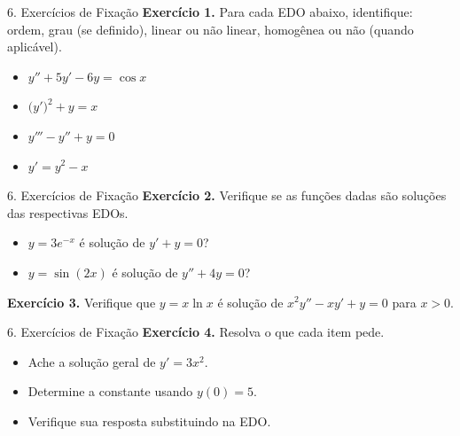 \documentclass[11pt, aspectratio=169, xcolor=table]{beamer}
\begin{document}

\begin{frame}{6. Exercícios de Fixação}
\textbf{Exercício 1.} Para cada EDO abaixo, identifique: ordem, grau (se definido), linear ou não linear, homogênea ou não (quando aplicável).
\begin{itemize}
  \item[a)] $y'' + 5y' - 6y = \cos x$
  \item[b)] $\bigl(y'\bigr)^2 + y = x$
  \item[c)] $y''' - y'' + y = 0$
  \item[d)] $y' = y^2 - x$
\end{itemize}
\end{frame}

\begin{frame}{6. Exercícios de Fixação}
\textbf{Exercício 2.} Verifique se as funções dadas são soluções das respectivas EDOs.
\begin{itemize}
  \item[a)] $y = 3e^{-x}$ é solução de $y' + y = 0$?
  \item[b)] $y = \sin(2x)$ é solução de $y'' + 4y = 0$?
\end{itemize}

\vspace{0.3cm}
\textbf{Exercício 3.} Verifique que $y = x\ln x$ é solução de $x^2 y'' - xy' + y = 0$ para $x>0$. \\
\end{frame}

\begin{frame}{6. Exercícios de Fixação}
\textbf{Exercício 4.} Resolva o que cada item pede.
\begin{itemize}
  \item[a)] Ache a solução geral de $y' = 3x^2$.
  \item[b)] Determine a constante usando $y(0) = 5$.
  \item[c)] Verifique sua resposta substituindo na EDO.
\end{itemize}
\end{frame}
\end{document}
